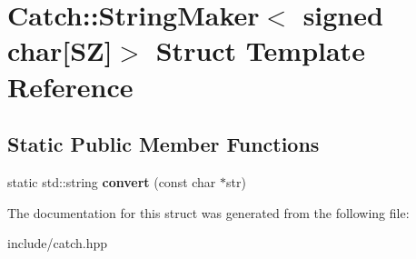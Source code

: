 \hypertarget{structCatch_1_1StringMaker_3_01signed_01char[SZ]_4}{}\section{Catch\+:\+:String\+Maker$<$ signed char\mbox{[}SZ\mbox{]}$>$ Struct Template Reference}
\label{structCatch_1_1StringMaker_3_01signed_01char[SZ]_4}
\subsection*{Static Public Member Functions}
\begin{DoxyCompactItemize}
\item 
static std\+::string {\bfseries convert} (const char $\ast$str)\hypertarget{structCatch_1_1StringMaker_3_01signed_01char[SZ]_4_ac17d7559af1b1177bae20c1ee028838b}{}\label{structCatch_1_1StringMaker_3_01signed_01char[SZ]_4_ac17d7559af1b1177bae20c1ee028838b}

\end{DoxyCompactItemize}


The documentation for this struct was generated from the following file\+:\begin{DoxyCompactItemize}
\item 
include/catch.\+hpp\end{DoxyCompactItemize}

